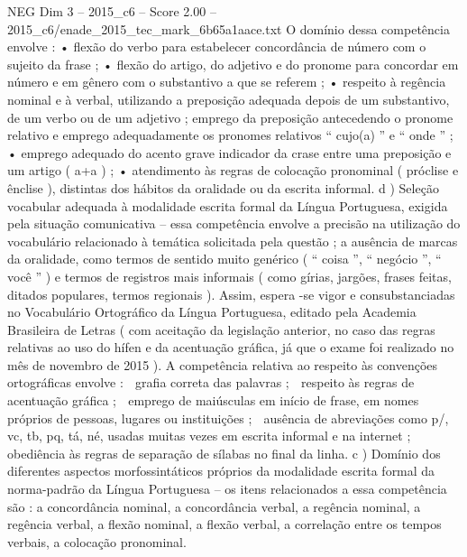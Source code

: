 \begin{textsample}{NEG Dim 3 – 2015\_c6 – Score 2.00 – 2015\_c6/enade\_2015\_tec\_mark\_6b65a1aace.txt}
O domínio dessa competência envolve : • flexão do verbo para estabelecer concordância de número com o sujeito da frase ; • flexão do artigo, do adjetivo e do pronome para concordar em número e em gênero com o substantivo a que se referem ; • respeito à regência nominal e à verbal, utilizando a preposição adequada depois de um substantivo, de um verbo ou de um adjetivo ; emprego da preposição antecedendo o pronome relativo e emprego adequadamente os pronomes relativos “ cujo(a) ” e “ onde ” ; • emprego adequado do acento grave indicador da crase entre uma preposição e um artigo ( a+a ) ; • atendimento às regras de colocação pronominal ( próclise e ênclise ), distintas dos hábitos da oralidade ou da escrita informal. d ) Seleção vocabular adequada à modalidade escrita formal da Língua Portuguesa, exigida pela situação comunicativa – essa competência envolve a precisão na utilização do vocabulário relacionado à temática solicitada pela questão ; a ausência de marcas da oralidade, como termos de sentido muito genérico ( “ coisa ”, “ negócio ”, “ você ” ) e termos de registros mais informais ( como gírias, jargões, frases feitas, ditados populares, termos regionais ).
Assim, espera -se vigor e consubstanciadas no Vocabulário Ortográfico da Língua Portuguesa, editado pela Academia Brasileira de Letras ( com aceitação da legislação anterior, no caso das regras relativas ao uso do hífen e da acentuação gráfica, já que o exame foi realizado no mês de novembro de 2015 ).
A competência relativa ao respeito às convenções ortográficas envolve :  grafia correta das palavras ;  respeito às regras de acentuação gráfica ;  emprego de maiúsculas em início de frase, em nomes próprios de pessoas, lugares ou instituições ;  ausência de abreviações como p/, vc, tb, pq, tá, né, usadas muitas vezes em escrita informal e na internet ;  obediência às regras de separação de sílabas no final da linha. c ) Domínio dos diferentes aspectos morfossintáticos próprios da modalidade escrita formal da norma-padrão da Língua Portuguesa – os itens relacionados a essa competência são : a concordância nominal, a concordância verbal, a regência nominal, a regência verbal, a flexão nominal, a flexão verbal, a correlação entre os tempos verbais, a colocação pronominal.

\end{textsample}
